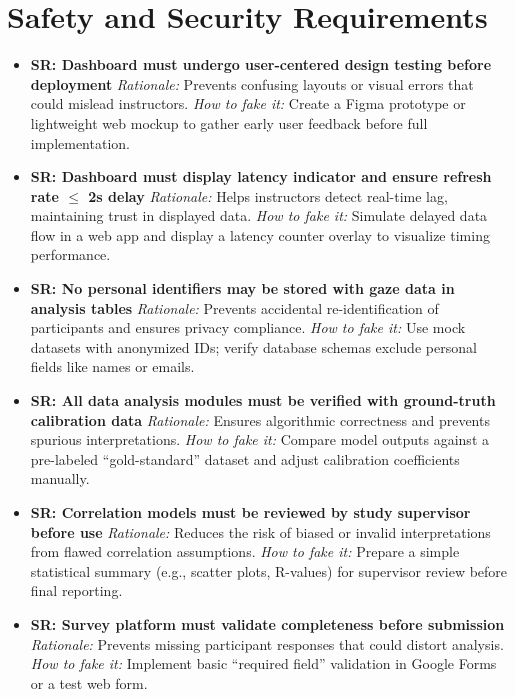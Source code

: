 \documentclass{article}
\begin{document}
\section{Safety and Security Requirements}
\begin{itemize}

    \item \textbf{SR: Dashboard must undergo user-centered design testing before deployment}  
    \textit{Rationale:} Prevents confusing layouts or visual errors that could mislead instructors.  
    \textit{How to fake it:} Create a Figma prototype or lightweight web mockup to gather early user feedback before full implementation.

    \item \textbf{SR: Dashboard must display latency indicator and ensure refresh rate $\leq$ 2s delay}  
    \textit{Rationale:} Helps instructors detect real-time lag, maintaining trust in displayed data.  
    \textit{How to fake it:} Simulate delayed data flow in a web app and display a latency counter overlay to visualize timing performance.

    \item \textbf{SR: No personal identifiers may be stored with gaze data in analysis tables}  
    \textit{Rationale:} Prevents accidental re-identification of participants and ensures privacy compliance.  
    \textit{How to fake it:} Use mock datasets with anonymized IDs; verify database schemas exclude personal fields like names or emails.

    \item \textbf{SR: All data analysis modules must be verified with ground-truth calibration data}  
    \textit{Rationale:} Ensures algorithmic correctness and prevents spurious interpretations.  
    \textit{How to fake it:} Compare model outputs against a pre-labeled “gold-standard” dataset and adjust calibration coefficients manually.

    \item \textbf{SR: Correlation models must be reviewed by study supervisor before use}  
    \textit{Rationale:} Reduces the risk of biased or invalid interpretations from flawed correlation assumptions.  
    \textit{How to fake it:} Prepare a simple statistical summary (e.g., scatter plots, R-values) for supervisor review before final reporting.

    \item \textbf{SR: Survey platform must validate completeness before submission}  
    \textit{Rationale:} Prevents missing participant responses that could distort analysis.  
    \textit{How to fake it:} Implement basic “required field” validation in Google Forms or a test web form.


\end{itemize}
\end{document}
